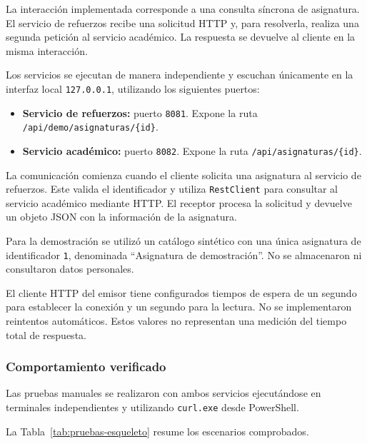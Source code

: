 La interacción implementada corresponde a una consulta síncrona de asignatura. El servicio de refuerzos recibe una solicitud HTTP y, para resolverla, realiza una segunda petición al servicio académico. La respuesta se devuelve al cliente en la misma interacción.

Los servicios se ejecutan de manera independiente y escuchan únicamente en la interfaz local \texttt{127.0.0.1}, utilizando los siguientes puertos:

\begin{itemize}
    \item \textbf{Servicio de refuerzos:} puerto \texttt{8081}. Expone la ruta \texttt{/api/demo/asignaturas/\{id\}}.

    \item \textbf{Servicio académico:} puerto \texttt{8082}. Expone la ruta \texttt{/api/asignaturas/\{id\}}.
\end{itemize}

La comunicación comienza cuando el cliente solicita una asignatura al servicio de refuerzos. Este valida el identificador y utiliza \texttt{RestClient} para consultar al servicio académico mediante HTTP. El receptor procesa la solicitud y devuelve un objeto JSON con la información de la asignatura.

Para la demostración se utilizó un catálogo sintético con una única asignatura de identificador \texttt{1}, denominada ``Asignatura de demostración''. No se almacenaron ni consultaron datos personales.

El cliente HTTP del emisor tiene configurados tiempos de espera de un segundo para establecer la conexión y un segundo para la lectura. No se implementaron reintentos automáticos. Estos valores no representan una medición del tiempo total de respuesta.

\subsubsection{Comportamiento verificado}

Las pruebas manuales se realizaron con ambos servicios ejecutándose en terminales independientes y utilizando \texttt{curl.exe} desde PowerShell.

La Tabla~\ref{tab:pruebas-esqueleto} resume los escenarios comprobados.

